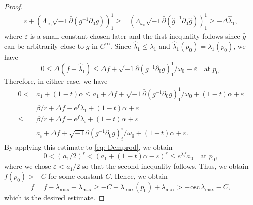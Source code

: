 \documentclass[a4, 12pt, 
]{amsart}
\numberwithin{equation}{section}
\theoremstyle{plain}
\theoremstyle{definition}
\theoremstyle{remark}
\begin{document}
\begin{proof}
\begin{equation*}
\begin{aligned}
       \varepsilon+\left(\Lambda_{\omega_0}\sqrt{-1}\bar{\partial}(g^{-1}\partial_0g)\right)^1_1
       \ge&\left(\Lambda_{\omega_0}\sqrt{-1}\bar{\partial}(\hat{g}^{-1}\partial_0\hat{g})\right)^1_1
       \ge- \Delta\hat{\lambda}_1,
    \end{aligned}
    \end{equation*}
    where $\varepsilon$ is a small constant chosen later and the first inequality follows since $\hat{g}$ can be arbitrarily close to $g$ in $C^\infty$.
    Since $\hat{\lambda}_1\le\lambda_1$ and $\hat{\lambda}_1(p_0)=\lambda_1(p_0)$, we have
    \begin{equation*}
        0\le\Delta (f-\hat{\lambda}_1)\le \Delta f+\sqrt{-1}\bar{\partial}(g^{-1}\partial_0g)^1_1/\omega_0+\varepsilon \quad \text{at } p_0.
    \end{equation*}
    Therefore, in either case, we have
    \begin{equation*}
    \begin{aligned}
     0<&a_1+(1-t)\alpha\le a_1+\Delta f+\sqrt{-1}\bar{\partial}(g^{-1}\partial_0g)^1_1/\omega_0+(1-t)\alpha+\varepsilon\\
     =&\beta/r+\Delta f-e^f \lambda_1+(1-t)\alpha+\varepsilon\\
     \le&\beta/r+\Delta f-e^f \lambda_i+(1-t)\alpha+\varepsilon\\
     =&a_i+\Delta f+\sqrt{-1}\bar{\partial}(g^{-1}\partial_0g)^i_i/\omega_0+(1-t)\alpha+\varepsilon.
    \end{aligned}
    \end{equation*}
    By applying this estimate to \eqref{eq: Demprod}, we obtain
    \begin{equation*}
        0<(a_1/2)^r<(a_1+(1-t)\alpha-\varepsilon)^r\le e^{\lambda f}a_0 \quad \text{at } p_0,
    \end{equation*}
    where we chose $\varepsilon<a_1/2$ so that the second inequality follows.
    Thus, we obtain $f(p_0)>-C$ for some constant $C$. Hence, we obtain
    \begin{equation*}
        f=f-\lambda_{\mathrm{max}}+\lambda_{\mathrm{max}}\ge-C-\lambda_{\mathrm{max}}(p_0)+\lambda_{\mathrm{max}}>-\mathrm{osc}\, \lambda_{\mathrm{max}}-C,
    \end{equation*}
    which is the desired estimate.
\end{proof}
\end{document}

